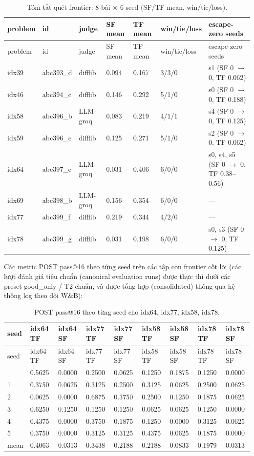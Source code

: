 \begin{longtable}{llllll p{4.2cm}}
\caption{Tóm tắt quét frontier: 8 bài $\times$ 6 seed (SF/TF mean, win/tie/loss).}\\
\toprule
problem & id & judge & SF mean & TF mean & win/tie/loss & escape-zero seeds \\
\midrule
\endfirsthead
\toprule
problem & id & judge & SF mean & TF mean & win/tie/loss & escape-zero seeds \\
\midrule
\endhead
\bottomrule
\endfoot
idx39 & abc393\_d & difflib & 0.094 & 0.167 & 3/3/0 & s1 (SF 0 $\rightarrow$ 0, TF 0.062) \\
idx46 & abc394\_c & difflib & 0.146 & 0.292 & 5/1/0 & s0 (SF 0 $\rightarrow$ 0, TF 0.188) \\
idx58 & abc396\_b & LLM-groq & 0.083 & 0.219 & 4/1/1 & s4 (SF 0 $\rightarrow$ 0, TF 0.125) \\
idx59 & abc396\_c & difflib & 0.125 & 0.271 & 5/1/0 & s2 (SF 0 $\rightarrow$ 0, TF 0.062) \\
idx64 & abc397\_e & LLM-groq & 0.031 & 0.406 & 6/0/0 & s0, s4, s5 (SF 0 $\rightarrow$ 0, TF 0.38--0.56) \\
idx69 & abc398\_b & LLM-groq & 0.156 & 0.354 & 6/0/0 & --- \\
idx77 & abc399\_f & difflib & 0.219 & 0.344 & 4/2/0 & --- \\
idx78 & abc399\_g & difflib & 0.031 & 0.198 & 6/0/0 & s0, s3 (SF 0 $\rightarrow$ 0, TF 0.125) \\
\end{longtable}

Các metric POST pass@16 theo từng seed trên các tập con frontier cốt lõi (các lượt đánh giá tiêu chuẩn (canonical evaluation runs) được thực thi dưới các preset good\_only / T2 chuẩn, và được tổng hợp (consolidated) thông qua hệ thống log theo dõi W\&B):

\begin{longtable}{lllllllll}
\caption{POST pass@16 theo từng seed cho idx64, idx77, idx58, idx78.}\\
\toprule
seed & idx64 TF & idx64 SF & idx77 TF & idx77 SF & idx58 TF & idx58 SF & idx78 TF & idx78 SF \\
\midrule
\endfirsthead
\toprule
seed & idx64 TF & idx64 SF & idx77 TF & idx77 SF & idx58 TF & idx58 SF & idx78 TF & idx78 SF \\
\midrule
\endhead
\bottomrule
\endfoot
0 & 0.5625 & 0.0000 & 0.2500 & 0.0625 & 0.1250 & 0.1875 & 0.1250 & 0.0000 \\
1 & 0.3750 & 0.0625 & 0.3125 & 0.2500 & 0.3125 & 0.0625 & 0.2500 & 0.0625 \\
2 & 0.0625 & 0.0000 & 0.6875 & 0.3750 & 0.2500 & 0.1250 & 0.1875 & 0.0625 \\
3 & 0.6250 & 0.1250 & 0.1250 & 0.1250 & 0.0625 & 0.0625 & 0.1250 & 0.0000 \\
4 & 0.4375 & 0.0000 & 0.3750 & 0.1875 & 0.1250 & 0.0000 & 0.3125 & 0.0625 \\
5 & 0.3750 & 0.0000 & 0.3125 & 0.3125 & 0.4375 & 0.0625 & 0.1875 & 0.0000 \\
mean & 0.4063 & 0.0313 & 0.3438 & 0.2188 & 0.2188 & 0.0833 & 0.1979 & 0.0313 \\
\end{longtable}

